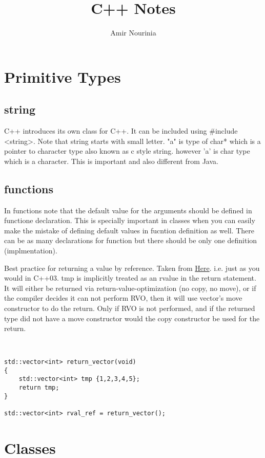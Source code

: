 \documentclass[11pt,twoside,a4paper]{report}
\author{Amir Nourinia}
\title{C++ Notes}
\begin{document}
\maketitle
\tableofcontents
\chapter{Primitive Types}

\section{string}
C++ introduces its own class for C++. It can be included using \#include <string>.
Note that string starts with small letter.
"a" is type of char* which is a pointer to character type also known as c style string.
however 'a' is char type which is a character. This is important and also different from Java.


\section{functions}
In functions note that the default value for the arguments should be defined in functione declaration. This is specially important in classes when you can easily make the mistake of defining default values in fucntion definition as well.
There can be as many declarations for function but there should be only one definition (implmentation).

Best practice for returning a value by reference. Taken from \href{https://stackoverflow.com/questions/4986673/c11-rvalues-and-move-semantics-confusion-return-statement}{Here}.
i.e. just as you would in C++03. tmp is implicitly treated as an rvalue in the return statement. It will either be returned via return-value-optimization (no copy, no move), or if the compiler decides it can not perform RVO, then it will use vector's move constructor to do the return. Only if RVO is not performed, and if the returned type did not have a move constructor would the copy constructor be used for the return.
\begin{lstlisting}


std::vector<int> return_vector(void)
{
    std::vector<int> tmp {1,2,3,4,5};
    return tmp;
}

std::vector<int> rval_ref = return_vector();

\end{lstlisting}

\chapter{Classes}
\end{document}
